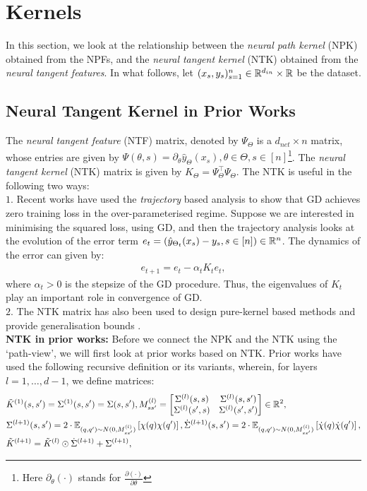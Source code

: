\section{Kernels}\label{sec:kernels}
In this section, we look at the relationship between the \emph{neural path kernel} (NPK) obtained from the NPFs, and the \emph{neural tangent kernel} (NTK) obtained from the \emph{neural tangent features}. In what follows, let $(x_s,y_s)_{s=1}^n\in\mathbb{R}^{d_{in}}\times\mathbb{R}$ be the dataset. \\
\subsection{Neural Tangent Kernel in Prior Works}

The \emph{neural tangent feature} (NTF) matrix, denoted by $\Psi_{\Theta}$ is a $d_{net}\times n$ matrix, whose entries are given by $\Psi(\theta,s)=\partial_{\theta} \hat{y}_{\Theta}(x_s),\theta\in\Theta, s\in[n]$\footnote{Here $\partial_{\theta}(\cdot)$ stands for $\frac{\partial (\cdot)}{\partial \theta}$}. The \emph{neural tangent kernel} (NTK) matrix is given by $K_{\Theta}=\Psi_{\Theta}^\top\Psi_{\Theta}$. The NTK is useful in the following two ways:\\
$1.$ Recent works have used the \emph{trajectory} based analysis to show that GD achieves zero training loss in the over-parameterised regime. Suppose we are interested in minimising the squared loss, using GD, and then the trajectory analysis looks at the evolution of the error term $e_t=(\hat{y}_{\Theta_t}(x_s)-y_s,s\in[n])\in\mathbb{R}^n$. The dynamics of the error can given by:
\begin{align}
e_{t+1}=e_t-\alpha_t K_t e_t,
\end{align}
where $\alpha_t>0$ is the stepsize of the GD procedure. Thus, the eigenvalues of $K_t$ play an important role in convergence of GD.\\
$2.$ The NTK matrix has also been used to design pure-kernel based methods \cite{arora2019exact} and provide generalisation bounds \cite{cao2019generalization}.\\
\textbf{NTK in prior works:} Before we connect the NPK and the NTK using the `path-view', we will first look at prior works based on NTK. Prior works have used the following recursive definition or its variants, wherein, for layers $l=1,\ldots, d-1$, we define matrices:
\begin{align}\label{eq:ntkold}
&\tilde{K}^{(1)}(s,s')=\Sigma^{(1)}(s,s')=\Sigma(s,s'), M^{(l)}_{ss'}=\left[\begin{matrix}\Sigma^{(l)}(s,s) & \Sigma^{(l)}(s,s')\\ \Sigma^{(l)}(s',s) & \Sigma^{(l)}(s',s')\end{matrix}\right]\in \mathbb{R}^2,\\
&\Sigma^{(l+1)}(s,s')= 2\cdot\mathbb{E}_{(q,q')\sim N(0,M_{ss'}^{(l)})} \left[\chi(q)\chi(q')\right], \dot{\Sigma}^{(l+1)}(s,s')= 2\cdot\mathbb{E}_{(q,q')\sim N(0,M_{ss'}^{(l)})}\left[\dot{\chi}(q)\dot{\chi}(q')\right],\nonumber\\
&\tilde{K}^{(l+1)}=\tilde{K}^{(l)}\odot \dot{\Sigma}^{(l+1)}+\Sigma^{(l+1)},\nonumber
\end{align}
